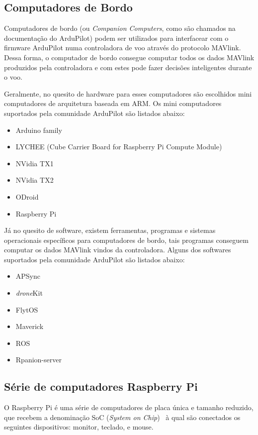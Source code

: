 \documentclass[12pt,a4paper,oneside]{book}
\begin{document}
\subsection{Computadores de Bordo}

Computadores de bordo (ou \textit{Companion Computers}, como são chamados na documentação do ArduPilot) podem ser utilizados para interfacear com o firmware ArduPilot numa controladora de voo através do protocolo MAVlink. Dessa forma, o computador de bordo consegue computar todos os dados MAVlink produzidos pela controladora e com estes pode fazer decisões inteligentes durante o voo. 

Geralmente, no quesito de hardware para esses computadores são escolhidos mini computadores de arquitetura baseada em ARM. Os mini computadores suportados pela comunidade ArduPilot são listados abaixo:

\begin{itemize}
  \item Arduino family
  \item LYCHEE (Cube Carrier Board for Raspberry Pi Compute Module)
  \item NVidia TX1
  \item NVidia TX2
  \item ODroid
  \item Raspberry Pi
\end{itemize}

Já no quesito de software, existem ferramentas, programas e sistemas operacionais específicos para computadores de bordo, tais programas conseguem computar os dados MAVlink vindos da controladora. Alguns dos softwares suportados pela comunidade ArduPilot são listados abaixo:

\begin{itemize}
  \item APSync
  \item \textit{drone}Kit
  \item FlytOS
  \item Maverick
  \item ROS
  \item Rpanion-server
\end{itemize}


\subsection {Série de computadores Raspberry Pi}
%
O Raspberry Pi é uma série de computadores de placa única e tamanho reduzido, que recebem a denominação  SoC (\textit{System on Chip})~\cite{url:soc} à qual são conectados os seguintes dispositivos: monitor, teclado, e mouse. 
\end{document}
